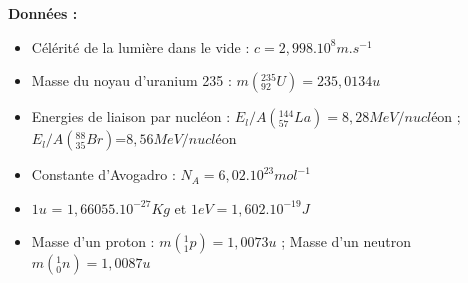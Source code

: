 \documentclass[12pt]{article}
\begin{document}
\textbf{Données :}
\begin{itemize}
	\item Célérité de la lumière dans le vide : $c = 2,998 . 10^8 m.s^{-1}$  
	\item Masse du noyau d’uranium 235 : $m( ^{235}_{92}U) = 235,0134u$ 

	\item Energies de liaison par nucléon : $E_l/A(^{144}_{57}La) = 8,28MeV/nucl$éon  ; $E_l/A(^{88}_{35}Br)$=$8,56MeV/nucl$éon
	\item Constante d'Avogadro : $N_A = 6,02.10^{23} mol^{-1}$
	\item $1u$ = $1,66055.10^{-27}Kg$ et $1eV = 1,602.10^{-19}J$
	\item Masse d’un proton : $m(^1_1p) = 1,0073u$ ; Masse d’un neutron $m(^1_0n) = 1,0087u$
\end{itemize}
\end{document}
